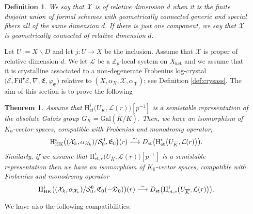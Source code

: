 \documentclass[asterisque,english]{smfart}
\newtheorem{definition}{Definition}[]
\newtheorem{theorem}{Theorem}[]
\begin{document}
\begin{definition}
\label{CupProd Def3}We say that $\mathcal{X}$ is of relative dimension $d$ when it is the finite disjoint union of formal schemes with geometrically connected generic and special fibers all of the same dimension 
$d$. If there is just one component, we say that $\mathcal{X}$ is geometrically connected of relative dimension $d$.
\end{definition}

Let $U:=X\backslash D$ and let $j\colon U\to X$ be the inclusion. Assume that $\mathcal{X}$ is proper of relative dimension $d$.
We let $\mathcal{L}$ be a $\mathbb{Z}_p$-local system on $X_{\mathrm{ket}}$ and we assume that it is crystalline associated to a non-degenerate Frobenius log-crystal $ \bigl(\mathcal{E},\mathrm{Fil}^\bullet \mathcal{E}, \nabla,\mathfrak{E},\varphi_{\mathfrak{E}}\bigr)$ relative to $(X,\alpha_X,\overline{\mathcal{X}},\alpha_{\overline{\mathcal{X}}})$; see Definition \ref{def:crysass}. The aim of this section is to prove the following

\begin{theorem}\label{thm:DstHK}  Assume that $\mathrm{H}^i_{\mathrm{et}}\bigl(U_{\overline{K}}, \mathcal{L}(r)\bigr)[p^{-1}]$ is a semistable representation of the absolute Galois group $G_K=\mathrm{Gal}(\overline{K}/K)$.
Then, we have an isomorphism of $K_0$-vector spaces, compatible with Frobenius and monodromy operator, $$\mathrm{H}^{i}_{\mathrm{HK}}\bigl((\mathcal{X}_k,\alpha_{\mathcal{X}_k})/ \mathcal{S}_0^0,\mathfrak{E}_0\bigr)(r) \stackrel{\sim}{\longrightarrow} D_{\rm st}\bigl(\mathrm{H}^i_{\mathrm{et}}\bigl(U_{\overline{K}}, \mathcal{L}(r)\bigr) \bigr).$$Similarly, if we assume that $\mathrm{H}^i_{\mathrm{et},c}\bigl(U_{\overline{K}}, \mathcal{L}(r)\bigr)[p^{-1}]$ is a semistable representation then  we have an isomorphism of $K_0$-vector spaces, compatible with Frobenius and monodromy operator
$$ \mathrm{H}^{i}_{\mathrm{HK}}\bigl((\mathcal{X}_k,\alpha_{\mathcal{X}_k})/ \mathcal{S}_0^0,\mathfrak{E}_0(-\mathfrak{D}_0)\bigr)(r) \stackrel{\sim}{\longrightarrow} D_{\rm st}\bigl(\mathrm{H}^i_{\mathrm{et},c}\bigl(U_{\overline{K}}, \mathcal{L}(r)\bigr) \bigr).$$
\end{theorem}

We have also the following compatibilities:
\end{document}
